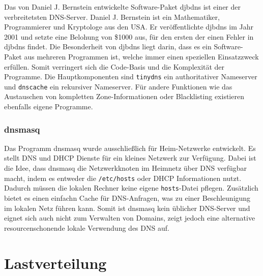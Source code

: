 \documentclass[a4paper, 12pt, BCOR10mm, DIV12, toc=bibliography, toc=listof, german]{scrbook}
\begin{document}
				Das von Daniel J. Bernstein entwickelte Software-Paket
				djbdns \cite{djbdns} ist einer der verbreitetsten DNS-Server. Daniel
				J.  Bernstein ist ein Mathematiker, Programmierer und Kryptologe aus den USA. Er
				veröffentlichte djbdns im Jahr 2001 und setzte eine
				Belohung \cite{guarantee} von \$1000 aus, für den ersten der
				einen Fehler in djbdns findet. Die Besonderheit von djbdns liegt darin, dass es ein
				Software-Paket aus mehreren Programmen ist, welche immer einen speziellen Einsatzzweck
				erfüllen. Somit verringert sich die Code-Basis und die Komplexität der Programme. Die
				Hauptkomponenten sind \texttt{tinydns} ein authoritativer Nameserver und \texttt{dnscache}
				ein rekursiver Nameserver. Für andere Funktionen wie das Austauschen von kompletten
				Zone-Informationen oder Blacklisting existieren ebenfalls eigene Programme.
				

				\subsubsection*{dnsmasq} %

				Das Programm dnsmasq \cite{dnsmasq} wurde
				ausschließlich für Heim-Netzwerke entwickelt. Es stellt DNS und DHCP Dienste für ein kleines
				Netzwerk zur Verfügung. Dabei ist die Idee, dass dnsmasq die Netzwerkknoten im Heimnetz über
				DNS verfügbar macht, indem es entweder die \texttt{/etc/hosts} oder DHCP Informationen
				nutzt. Dadurch müssen die lokalen Rechner keine eigene \texttt{hosts}-Datei pflegen.
				Zusätzlich bietet es einen einfachn Cache für DNS-Anfragen, was zu einer Beschleunigung im
				lokalen Netz führen kann. Somit ist dnsmasq kein üblicher DNS-Server und eignet sich auch
				nicht zum Verwalten von Domains, zeigt jedoch eine alternative resourcenschonende lokale
				Verwendung des DNS auf.
				


			

		\section{Lastverteilung} %
		\label{sec:lastverteilung}
\end{document}
